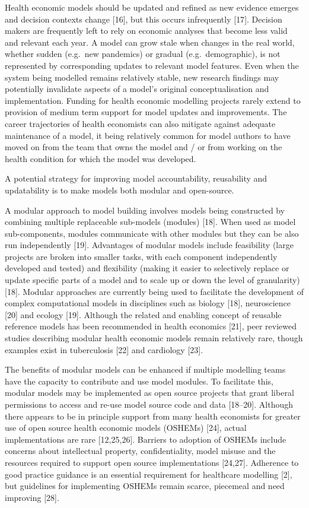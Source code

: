 \documentclass[
]{article}
\begin{document}
Health economic models should be updated and refined as new evidence emerges and decision contexts change {[}16{]}, but this occurs infrequently {[}17{]}. Decision makers are frequently left to rely on economic analyses that become less valid and relevant each year. A model can grow stale when changes in the real world, whether sudden (e.g.~new pandemics) or gradual (e.g.~demographic), is not represented by corresponding updates to relevant model features. Even when the system being modelled remains relatively stable, new research findings may potentially invalidate aspects of a model's original conceptualisation and implementation. Funding for health economic modelling projects rarely extend to provision of medium term support for model updates and improvements. The career trajectories of health economists can also mitigate against adequate maintenance of a model, it being relatively common for model authors to have moved on from the team that owns the model and / or from working on the health condition for which the model was developed.

A potential strategy for improving model accountability, reusability and updatability is to make models both modular and open-source.

A modular approach to model building involves models being constructed by combining multiple replaceable sub-models (modules) {[}18{]}. When used as model sub-components, modules communicate with other modules but they can be also run independently {[}19{]}. Advantages of modular models include feasibility (large projects are broken into smaller tasks, with each component independently developed and tested) and flexibility (making it easier to selectively replace or update specific parts of a model and to scale up or down the level of granularity) {[}18{]}. Modular approaches are currently being used to facilitate the development of complex computational models in disciplines such as biology {[}18{]}, neuroscience {[}20{]} and ecology {[}19{]}. Although the related and enabling concept of reusable reference models has been recommended in health economics {[}21{]}, peer reviewed studies describing modular health economic models remain relatively rare, though examples exist in tuberculosis {[}22{]} and cardiology {[}23{]}.

The benefits of modular models can be enhanced if multiple modelling teams have the capacity to contribute and use model modules. To facilitate this, modular models may be implemented as open source projects that grant liberal permissions to access and re-use model source code and data {[}18--20{]}. Although there appears to be in principle support from many health economists for greater use of open source health economic models (OSHEMs) {[}24{]}, actual implementations are rare {[}12,25,26{]}. Barriers to adoption of OSHEMs include concerns about intellectual property, confidentiality, model misuse and the resources required to support open source implementations {[}24,27{]}. Adherence to good practice guidance is an essential requirement for healthcare modelling {[}2{]}, but guidelines for implementing OSHEMs remain scarce, piecemeal and need improving {[}28{]}.
\end{document}
